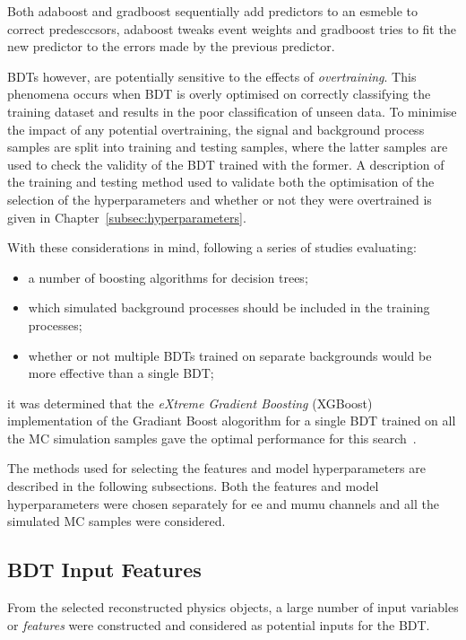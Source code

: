 Both adaboost and gradboost sequentially add predictors to an esmeble to correct predesccsors, adaboost tweaks event weights and gradboost tries to fit the new predictor to the errors made by the previous predictor.


BDTs however, are potentially sensitive to the effects of \emph{overtraining}.
This phenomena occurs when BDT is overly optimised on correctly classifying the training dataset and results in the poor classification of unseen data.
To minimise the impact of any potential overtraining, the signal and background process samples are split into training and testing samples, where the latter samples are used to check the validity of the BDT trained with the former.
A description of the training and testing method used to validate both the optimisation of the selection of the hyperparameters and whether or not they were overtrained is given in Chapter~\ref{subsec:hyperparameters}.


With these considerations in mind, following a series of studies evaluating:

\begin{itemize}
\item a number of boosting algorithms for decision trees;
\item which simulated background processes should be included in the training processes;
\item whether or not multiple BDTs trained on separate backgrounds would be more effective than a single BDT;
\end{itemize}

it was determined that the \emph{eXtreme Gradient Boosting} (XGBoost) implementation of the Gradiant Boost alogorithm for a single BDT trained on all the MC simulation samples gave the optimal performance for this search~\cite{xgboost}.

The methods used for selecting the features and model hyperparameters are described in the following subsections.
Both the features and model hyperparameters were chosen separately for ee and mumu channels and all the simulated MC samples were considered.

\subsection{BDT Input Features}
From the selected reconstructed physics objects, a large number of input variables or \emph{features} were constructed and considered as potential inputs for the BDT.

